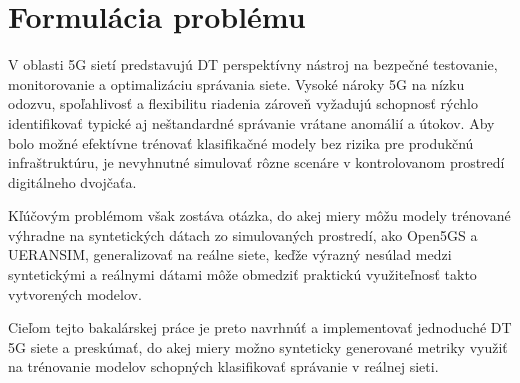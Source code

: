 \section{Formulácia problému}
V oblasti 5G sietí predstavujú DT perspektívny nástroj na bezpečné testovanie, monitorovanie a optimalizáciu správania siete. Vysoké nároky 5G na nízku odozvu, spoľahlivosť a flexibilitu riadenia zároveň vyžadujú schopnosť rýchlo identifikovať typické aj neštandardné správanie vrátane anomálií a útokov. Aby bolo možné efektívne trénovať klasifikačné modely bez rizika pre produkčnú infraštruktúru, je nevyhnutné simulovať rôzne scenáre v kontrolovanom prostredí digitálneho dvojčaťa.

Kľúčovým problémom však zostáva otázka, do akej miery môžu modely trénované výhradne na syntetických dátach zo simulovaných prostredí, ako Open5GS a UERANSIM, generalizovať na reálne siete, keďže výrazný nesúlad medzi syntetickými a reálnymi dátami môže obmedziť praktickú využiteľnosť takto vytvorených modelov.

Cieľom tejto bakalárskej práce je preto navrhnúť a implementovať jednoduché DT 5G siete a preskúmať, do akej miery možno synteticky generované metriky využiť na trénovanie modelov schopných klasifikovať správanie v reálnej sieti.